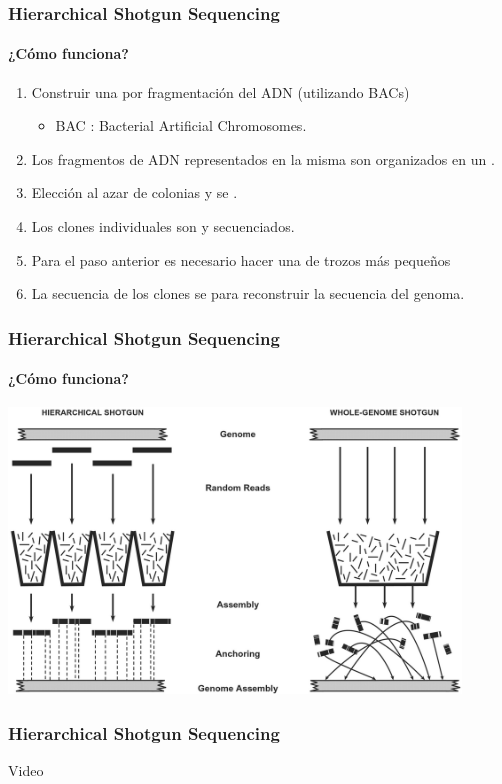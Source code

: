 \frame
{
\frametitle{Hierarchical Shotgun Sequencing}
\framesubtitle{¿Cómo funciona?}
\begin{enumerate}
	\item<1-> Construir una  por fragmentación del ADN (utilizando BACs)
	\begin{itemize}
		\item<1-> BAC : Bacterial Artificial Chromosomes.
	\end{itemize}
	\item<2-> Los fragmentos de ADN representados en la misma son organizados en un .
	\item<3-> Elección al azar de colonias y se .
	\item<4-> Los clones individuales son  y secuenciados.
	\item<5-> Para el paso anterior es necesario hacer una  de trozos más pequeños
	\item<6-> La secuencia de los clones se  para reconstruir la secuencia del genoma.
\end{enumerate}
}
%

\frame
{
\frametitle{Hierarchical Shotgun Sequencing}
\framesubtitle{¿Cómo funciona?}
\begin{center}
	\includegraphics[width=0.9\textwidth]{img/shotguns}
\end{center}
}

\frame
{
\frametitle{Hierarchical Shotgun Sequencing}
\begin{center}
	\huge{Video}
\end{center}
}
